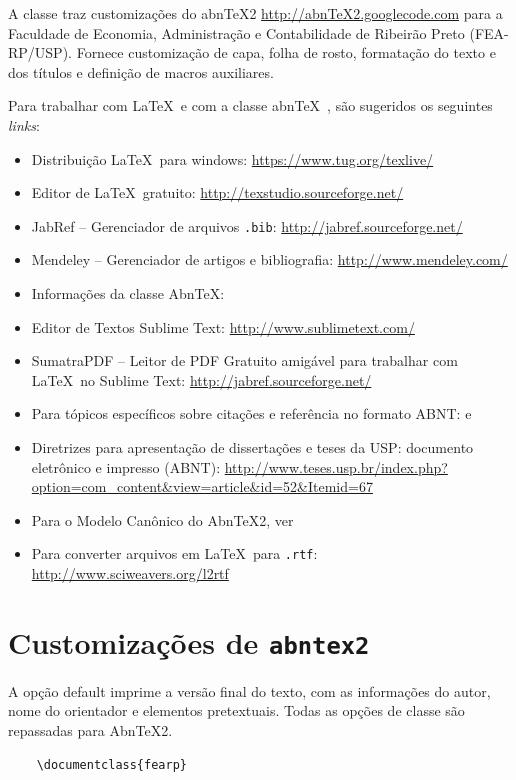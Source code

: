 \documentclass[rec]{fearp}
\begin{document}
A classe traz customizações do abnTeX2 \url{http://abnTeX2.googlecode.com} para a Faculdade de Economia, Administração e Contabilidade de Ribeirão Preto (FEA-RP/USP). Fornece customização de capa, folha de rosto, formatação do texto e dos títulos e definição de macros auxiliares. 

Para trabalhar com \LaTeX\ e com a classe abn\TeX\ , são sugeridos os seguintes \textit{links}:
\begin{itemize}
  \item Distribuição \LaTeX\ para windows: \url{https://www.tug.org/texlive/}
  \item Editor de \LaTeX\ gratuito: \url{http://texstudio.sourceforge.net/}
  \item JabRef -- Gerenciador de arquivos \texttt{.bib}: \url{http://jabref.sourceforge.net/}
  \item Mendeley -- Gerenciador de artigos e bibliografia: \url{http://www.mendeley.com/}
  \item Informações da classe Abn\TeX : 
  \item Editor de Textos Sublime Text: \url{http://www.sublimetext.com/}
  \item SumatraPDF -- Leitor de PDF Gratuito amigável para trabalhar com \LaTeX\ no Sublime Text: \url{http://jabref.sourceforge.net/}
  \item Para tópicos específicos sobre citações e referência no formato ABNT: \cite{abntex22013b} e \cite{abntex22013c}
  \item Diretrizes para apresentação de dissertações e teses da USP: documento eletrônico e impresso (ABNT): \url{http://www.teses.usp.br/index.php?option=com_content&view=article&id=52&Itemid=67}
  \item Para o Modelo Canônico do AbnTeX2, ver 
  \item Para converter arquivos em \LaTeX\ para \texttt{.rtf}: \url{http://www.sciweavers.org/l2rtf}
\end{itemize}

\section{Customizações de \texttt{abntex2}}

A opção default imprime a versão final do texto, com as informações do autor, nome do orientador e elementos pretextuais. Todas as opções de classe são repassadas para Abn\TeX 2.
\begin{verbatim}
    \documentclass{fearp}
\end{verbatim} 
\end{document}
